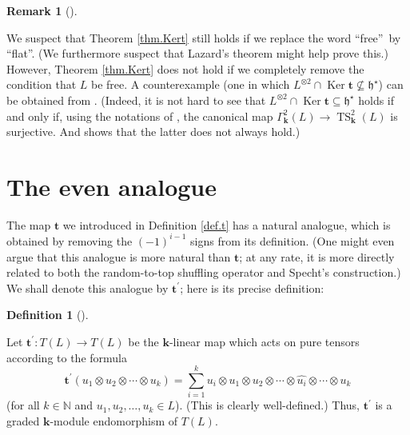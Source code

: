 \documentclass[numbers=enddot,12pt,final,onecolumn,notitlepage]{scrartcl}%
\theoremstyle{definition}
\newtheorem{defi}[theo]{Definition}
\newenvironment{definition}[1][]
{\begin{defi}[#1]\begin{leftbar}}
{\end{leftbar}\end{defi}}
\newtheorem{remk}[theo]{Remark}
\newenvironment{remark}[1][]
{\begin{remk}[#1]\begin{leftbar}}
{\end{leftbar}\end{remk}}
\let\sumnonlimits\sum
\renewcommand{\sum}{\sumnonlimits\limits}
\begin{document}
\begin{remark}
\label{rmk.Kert.free}We suspect that Theorem \ref{thm.Kert} still holds if we
replace the word \textquotedblleft free\textquotedblright\ by
\textquotedblleft flat\textquotedblright. (We furthermore suspect that
Lazard's theorem might help prove this.) However, Theorem \ref{thm.Kert} does
not hold if we completely remove the condition that $L$ be free. A
counterexample (one in which $L^{\otimes2}\cap\operatorname*{Ker}%
\mathbf{t}\not \subseteq \mathfrak{h}^{\star}$) can be obtained from
\cite[Example 4.6]{Lundkv08}. (Indeed, it is not hard to see that
$L^{\otimes2}\cap\operatorname*{Ker}\mathbf{t}\subseteq\mathfrak{h}^{\star}$
holds if and only if, using the notations of \cite{Lundkv08}, the canonical
map $\Gamma_{\mathbf{k}}^{2}\left(  L\right)  \rightarrow\operatorname*{TS}%
\nolimits_{\mathbf{k}}^{2}\left(  L\right)  $ is surjective. And \cite[Example
4.6]{Lundkv08} shows that the latter does not always hold.)
\end{remark}


\section{The even analogue}

The map $\mathbf{t}$ we introduced in Definition \ref{def.t} has a natural
analogue, which is obtained by removing the $\left(  -1\right)  ^{i-1}$ signs
from its definition. (One might even argue that this analogue is more natural
than $\mathbf{t}$; at any rate, it is more directly related to both the
random-to-top shuffling operator and Specht's construction.) We shall denote
this analogue by $\mathbf{t}^{\prime}$; here is its precise definition:

\begin{definition}
\label{def.t'}Let $\mathbf{t}^{\prime}:T\left(  L\right)  \rightarrow T\left(
L\right)  $ be the $\mathbf{k}$-linear map which acts on pure tensors
according to the formula%
\[
\mathbf{t}^{\prime}\left(  u_{1}\otimes u_{2}\otimes\cdots\otimes
u_{k}\right)  =\sum_{i=1}^{k}u_{i}\otimes u_{1}\otimes u_{2}\otimes
\cdots\otimes\widehat{u_{i}}\otimes\cdots\otimes u_{k}%
\]
(for all $k\in\mathbb{N}$ and $u_{1},u_{2},\ldots,u_{k}\in L$). (This is
clearly well-defined.) Thus, $\mathbf{t}^{\prime}$ is a graded $\mathbf{k}%
$-module endomorphism of $T\left(  L\right)  $.
\end{definition}
\end{document}
